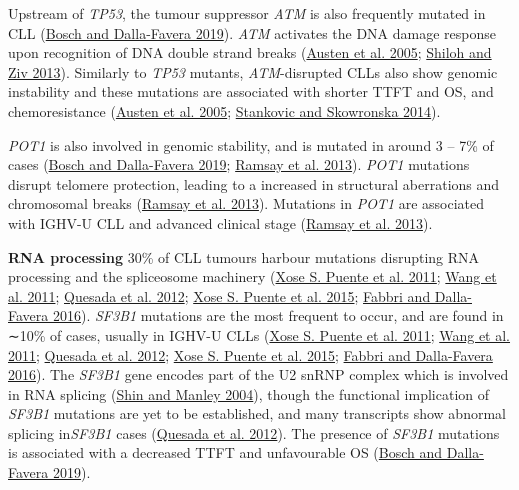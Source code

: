 \documentclass[11pt, a4paper, twosided]{book}
\begin{document}
Upstream of \emph{TP53}, the tumour suppressor \emph{ATM} is also frequently mutated in CLL (\protect\hyperlink{ref-Bosch2019}{Bosch and Dalla-Favera 2019}). \emph{ATM} activates the DNA damage response upon recognition of DNA double strand breaks (\protect\hyperlink{ref-Austen2005}{Austen et al. 2005}; \protect\hyperlink{ref-Shiloh2013}{Shiloh and Ziv 2013}). Similarly to \emph{TP53} mutants, \emph{ATM}-disrupted CLLs also show genomic instability and these mutations are associated with shorter TTFT and OS, and chemoresistance (\protect\hyperlink{ref-Austen2005}{Austen et al. 2005}; \protect\hyperlink{ref-Stankovic2014}{Stankovic and Skowronska 2014}).

\emph{POT1} is also involved in genomic stability, and is mutated in around 3 -- 7\% of cases (\protect\hyperlink{ref-Bosch2019}{Bosch and Dalla-Favera 2019}; \protect\hyperlink{ref-Ramsay2013b}{Ramsay et al. 2013}). \emph{POT1} mutations disrupt telomere protection, leading to a increased in structural aberrations and chromosomal breaks (\protect\hyperlink{ref-Ramsay2013b}{Ramsay et al. 2013}). Mutations in \emph{POT1} are associated with IGHV-U CLL and advanced clinical stage (\protect\hyperlink{ref-Ramsay2013b}{Ramsay et al. 2013}).

\textbf{RNA processing}
30\% of CLL tumours harbour mutations disrupting RNA processing and the spliceosome machinery (\protect\hyperlink{ref-Puente2011}{Xose S. Puente et al. 2011}; \protect\hyperlink{ref-Wang2011}{Wang et al. 2011}; \protect\hyperlink{ref-Quesada2012}{Quesada et al. 2012}; \protect\hyperlink{ref-Puente2015}{Xose S. Puente et al. 2015}; \protect\hyperlink{ref-Fabbri2016}{Fabbri and Dalla-Favera 2016}).
\emph{SF3B1} mutations are the most frequent to occur, and are found in ∼10\% of cases, usually in IGHV-U CLLs (\protect\hyperlink{ref-Puente2011}{Xose S. Puente et al. 2011}; \protect\hyperlink{ref-Wang2011}{Wang et al. 2011}; \protect\hyperlink{ref-Quesada2012}{Quesada et al. 2012}; \protect\hyperlink{ref-Puente2015}{Xose S. Puente et al. 2015}; \protect\hyperlink{ref-Fabbri2016}{Fabbri and Dalla-Favera 2016}). The \emph{SF3B1} gene encodes part of the U2 snRNP complex which is involved in RNA splicing (\protect\hyperlink{ref-Shin2004}{Shin and Manley 2004}), though the functional implication of \emph{SF3B1} mutations are yet to be established, and many transcripts show abnormal splicing in\emph{SF3B1} cases (\protect\hyperlink{ref-Quesada2012}{Quesada et al. 2012}). The presence of \emph{SF3B1} mutations is associated with a decreased TTFT and unfavourable OS (\protect\hyperlink{ref-Bosch2019}{Bosch and Dalla-Favera 2019}).
\end{document}
